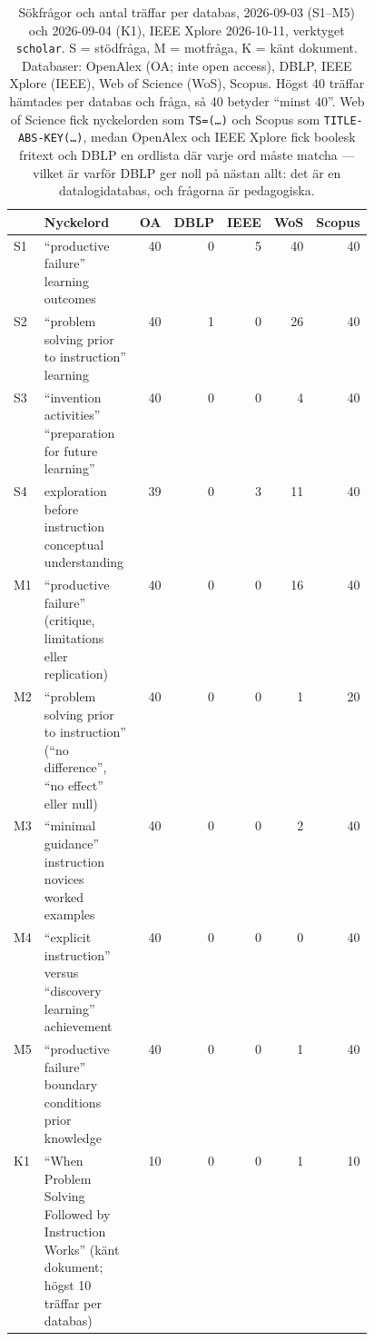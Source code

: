 \begin{table}[htbp]
  \centering
  \caption{Sökfrågor och antal träffar per databas, 2026-09-03
    (S1--M5) och 2026-09-04 (K1), IEEE Xplore 2026-10-11, verktyget
    \texttt{scholar}.  S = stödfråga, M = motfråga, K = känt dokument.
    Databaser: OpenAlex (OA; inte \foreignlanguage{english}{open access}),
    DBLP, IEEE Xplore (IEEE), Web of Science (WoS), Scopus.  Högst 40 träffar hämtades per databas och fråga,
    så 40 betyder \enquote{minst 40}.  Web of Science fick nyckelorden som
    \texttt{TS=(\dots)} och Scopus som \texttt{TITLE-ABS-KEY(\dots)}, medan
    OpenAlex och IEEE Xplore fick boolesk fritext och DBLP en ordlista där varje ord måste
    matcha --- vilket är varför DBLP ger noll på nästan allt: det är en
    datalogidatabas, och frågorna är pedagogiska.}
  \label{tab:pf-queries}
  \footnotesize
  \begin{tabular}{@{}lp{0.46\linewidth}rrrrr@{}}
    \toprule
    & Nyckelord & OA & DBLP & IEEE & WoS & Scopus \\
    \midrule
    S1 & \enquote{productive failure} learning outcomes
       & 40 & 0 & 5 & 40 & 40 \\
    S2 & \enquote{problem solving prior to instruction} learning
       & 40 & 1 & 0 & 26 & 40 \\
    S3 & \enquote{invention activities} \enquote{preparation for future
         learning}
       & 40 & 0 & 0 & 4 & 40 \\
    S4 & exploration before instruction conceptual understanding
       & 39 & 0 & 3 & 11 & 40 \\
    \midrule
    M1 & \enquote{productive failure} (critique, limitations eller
         replication)
       & 40 & 0 & 0 & 16 & 40 \\
    M2 & \enquote{problem solving prior to instruction}
         (\enquote{no difference}, \enquote{no effect} eller null)
       & 40 & 0 & 0 & 1 & 20 \\
    M3 & \enquote{minimal guidance} instruction novices worked examples
       & 40 & 0 & 0 & 2 & 40 \\
    M4 & \enquote{explicit instruction} versus \enquote{discovery
         learning} achievement
       & 40 & 0 & 0 & 0 & 40 \\
    M5 & \enquote{productive failure} boundary conditions prior knowledge
       & 40 & 0 & 0 & 1 & 40 \\
    \midrule
    K1 & \enquote{When Problem Solving Followed by Instruction Works}
         (känt dokument; högst 10 träffar per databas)
       & 10 & 0 & 0 & 1 & 10 \\
    \bottomrule
  \end{tabular}
\end{table}


